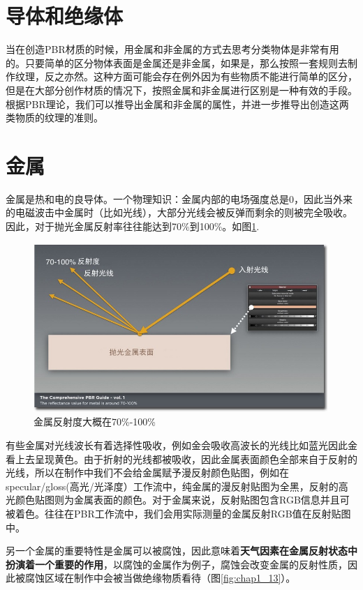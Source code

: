 \section{导体和绝缘体}

当在创造PBR材质的时候，用金属和非金属的方式去思考分类物体是非常有用的。只要简单的区分物体表面是金属还是非金属，如果是，那么按照一套规则去制作纹理，反之亦然。这种方面可能会存在例外因为有些物质不能进行简单的区分，但是在大部分创作材质的情况下，按照金属和非金属进行区别是一种有效的手段。根据PBR理论，我们可以推导出金属和非金属的属性，并进一步推导出创造这两类物质的纹理的准则。

\section{金属}

金属是热和电的良导体。一个物理知识：金属内部的电场强度总是0，因此当外来的电磁波击中金属时（比如光线），大部分光线会被反弹而剩余的则被完全吸收。因此，对于抛光金属反射率往往能达到70\%到100\%。如图\ref{fig:chap1_12}.

\begin{figure}[ht]
    \centering
	\includegraphics[width=\textwidth]{images/chap1_12.jpg}
	\caption{金属反射度大概在70\%-100\%}
    \label{fig:chap1_12}
\end{figure}

有些金属对光线波长有着选择性吸收，例如金会吸收高波长的光线比如蓝光因此金看上去呈现黄色。由于折射的光线都被吸收，因此金属表面颜色全部来自于反射的光线，所以在制作中我们不会给金属赋予漫反射颜色贴图，例如在specular/gloss(高光/光泽度）工作流中，纯金属的漫反射贴图为全黑，反射的高光颜色贴图则为金属表面的颜色。对于金属来说，反射贴图包含RGB信息并且可被着色。往往在PBR工作流中，我们会用实际测量的金属反射RGB值在反射贴图中。

另一个金属的重要特性是金属可以被腐蚀，因此意味着\textbf{天气因素在金属反射状态中扮演着一个重要的作用}，以腐蚀的金属作为例子，腐蚀会改变金属的反射性质，因此被腐蚀区域在制作中会被当做绝缘物质看待（图\ref{fig:chap1_13}）。

